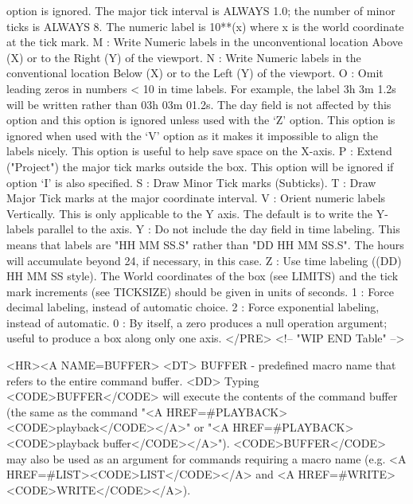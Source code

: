 \begin{rawhtml}
      option is ignored.  The major tick interval is ALWAYS 1.0;
      the number of minor ticks is ALWAYS 8.  The numeric label is
      10**(x) where x is the world coordinate at the tick mark.
  M : Write Numeric labels in the unconventional location Above (X)
      or to the Right (Y) of the viewport.
  N : Write Numeric labels in the conventional location Below (X)
      or to the Left (Y) of the viewport.
  O : Omit leading zeros in numbers < 10 in time labels.  For
      example, the label 3h 3m 1.2s will be written rather than
      03h 03m 01.2s.  The day field is not affected by this option
      and this option is ignored unless used with the `Z' option.
      This option is ignored when used with the `V' option as it
      makes it impossible to align the labels nicely.  This option
      is useful to help save space on the X-axis.
  P : Extend ("Project") the major tick marks outside the box.  This
      option will be ignored if option `I' is also specified.
  S : Draw Minor Tick marks (Subticks).
  T : Draw Major Tick marks at the major coordinate interval.
  V : Orient numeric labels Vertically.  This is only applicable
      to the Y axis.  The default is to write the Y-labels parallel
      to the axis.
  Y : Do not include the day field in time labeling.  This means
      that labels are "HH MM SS.S" rather than "DD HH MM SS.S".
      The hours will accumulate beyond 24, if necessary, in this case.
  Z : Use time labeling ((DD) HH MM SS style).  The World
      coordinates of the box (see LIMITS) and the tick mark increments
      (see TICKSIZE) should be given in units of seconds.
  1 : Force decimal labeling, instead of automatic choice.
  2 : Force exponential labeling, instead of automatic.
  0 : By itself, a zero produces a null operation argument; useful
      to produce a box along only one axis.
	</PRE>
<!-- "WIP END Table" -->

<HR><A NAME=BUFFER>
<DT>
BUFFER - predefined macro name that refers to the entire command buffer.
<DD>
	Typing <CODE>BUFFER</CODE> will execute the contents of the
	command buffer (the same as the command
	"<A HREF=#PLAYBACK><CODE>playback</CODE></A>" or
	"<A HREF=#PLAYBACK><CODE>playback buffer</CODE></A>").
	<CODE>BUFFER</CODE> may also be used as an argument for commands
	requiring a macro name (e.g.  <A HREF=#LIST><CODE>LIST</CODE></A>
	and <A HREF=#WRITE><CODE>WRITE</CODE></A>).


\end{rawhtml}
